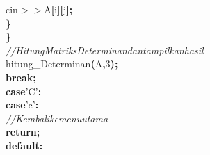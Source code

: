 \documentclass[a4paper, 10pt]{article}
\newcommand\SPC{\hspace*{0.6em}}
\newcommand{\CppACharacter}[1]{#1}
\newcommand{\CppAComment}[1]{\textit{\textcolor[rgb]{0,0.47,0.84}{#1}}}
\newcommand{\CppAIdentifier}[1]{#1}
\newcommand{\CppANumber}[1]{\textcolor[rgb]{0.5,0,0.5}{#1}}
\newcommand{\CppAReservedWord}[1]{\textbf{#1}}
\newcommand{\CppASpace}[1]{\colorbox[rgb]{1,1,1}{#1}}
\newcommand{\CppASymbol}[1]{\textbf{\textcolor[rgb]{1,0,0}{#1}}}
\begin{document}
\begin{ttfamily}
\CppASpace{\SPC \SPC \SPC \SPC \SPC \SPC \SPC \SPC \SPC \SPC \SPC \SPC \SPC \SPC \SPC \SPC \SPC \SPC \SPC \SPC \SPC \SPC \SPC \SPC \SPC \SPC \SPC \SPC \SPC \SPC \SPC \SPC }\CppAIdentifier{cin}\CppASpace{\SPC }\CppASymbol{$>$$>$}\CppASpace{\SPC }\CppAIdentifier{A}\CppASymbol{[}\CppAIdentifier{i}\CppASymbol{]}\CppASymbol{[}\CppAIdentifier{j}\CppASymbol{]}\CppASymbol{;}\\
\CppASpace{\SPC \SPC \SPC \SPC \SPC \SPC \SPC \SPC \SPC \SPC \SPC \SPC \SPC \SPC \SPC \SPC \SPC \SPC \SPC \SPC \SPC \SPC \SPC \SPC \SPC \SPC \SPC \SPC }\CppASymbol{\}}\\
\CppASpace{\SPC \SPC \SPC \SPC \SPC \SPC \SPC \SPC \SPC \SPC \SPC \SPC \SPC \SPC \SPC \SPC \SPC \SPC \SPC \SPC \SPC \SPC \SPC \SPC }\CppASymbol{\}}\\
\CppASpace{\SPC \SPC \SPC \SPC \SPC \SPC \SPC \SPC \SPC \SPC \SPC \SPC \SPC \SPC \SPC \SPC \SPC \SPC \SPC \SPC \SPC \SPC \SPC \SPC }\CppAComment{//\SPC Hitung\SPC Matriks\SPC Determinan\SPC dan\SPC tampilkan\SPC hasil}\\
\CppASpace{\SPC \SPC \SPC \SPC \SPC \SPC \SPC \SPC \SPC \SPC \SPC \SPC \SPC \SPC \SPC \SPC \SPC \SPC \SPC \SPC \SPC \SPC \SPC \SPC }\CppAIdentifier{hitung\_Determinan}\CppASymbol{(}\CppAIdentifier{A}\CppASymbol{,}\CppASpace{\SPC }\CppANumber{3}\CppASymbol{)}\CppASymbol{;}\\
\CppASpace{\SPC \SPC \SPC \SPC \SPC \SPC \SPC \SPC \SPC \SPC \SPC \SPC \SPC \SPC \SPC \SPC \SPC \SPC \SPC \SPC \SPC \SPC \SPC \SPC }\CppAReservedWord{break}\CppASymbol{;}\\
\CppASpace{\SPC \SPC \SPC \SPC \SPC \SPC \SPC \SPC \SPC \SPC \SPC \SPC \SPC \SPC \SPC \SPC \SPC \SPC \SPC \SPC }\CppAReservedWord{case}\CppASpace{\SPC }\CppACharacter{'C'}\CppASymbol{:}\\
\CppASpace{\SPC \SPC \SPC \SPC \SPC \SPC \SPC \SPC \SPC \SPC \SPC \SPC \SPC \SPC \SPC \SPC \SPC \SPC \SPC \SPC }\CppAReservedWord{case}\CppASpace{\SPC }\CppACharacter{'c'}\CppASymbol{:}\\
\CppASpace{\SPC \SPC \SPC \SPC \SPC \SPC \SPC \SPC \SPC \SPC \SPC \SPC \SPC \SPC \SPC \SPC \SPC \SPC \SPC \SPC \SPC \SPC \SPC \SPC }\CppAComment{//\SPC Kembali\SPC ke\SPC menu\SPC utama}\\
\CppASpace{\SPC \SPC \SPC \SPC \SPC \SPC \SPC \SPC \SPC \SPC \SPC \SPC \SPC \SPC \SPC \SPC \SPC \SPC \SPC \SPC \SPC \SPC \SPC \SPC }\CppAReservedWord{return}\CppASymbol{;}\\
\CppASpace{\SPC \SPC \SPC \SPC \SPC \SPC \SPC \SPC \SPC \SPC \SPC \SPC \SPC \SPC \SPC \SPC \SPC \SPC \SPC \SPC }\CppAReservedWord{default}\CppASymbol{:}\\

\end{ttfamily}
\end{document}
